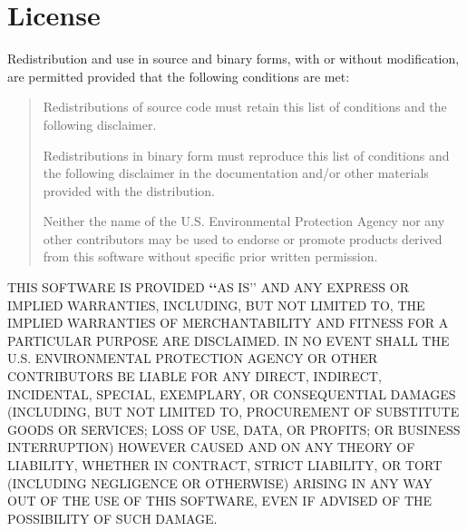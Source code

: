 \documentclass[letterpaper,10pt,english]{sphinxmanual}
\begin{document}
\section{License}
\label{\detokenize{license:license}}\label{\detokenize{license:id1}}\label{\detokenize{license::doc}}
Redistribution and use in source and binary forms, with or without modification,
are permitted provided that the following conditions are met:
\begin{quote}

Redistributions of source code must retain this list of conditions and the
following disclaimer.

Redistributions in binary form must reproduce this list of conditions and
the following disclaimer in the documentation and/or other materials
provided with the distribution.

Neither the name of the U.S. Environmental Protection Agency nor any other
contributors may be used to endorse or promote products derived from this
software without specific prior written permission.
\end{quote}

THIS SOFTWARE IS PROVIDED {\color{red}\bfseries{}{}`{}`}AS IS’’ AND ANY EXPRESS OR IMPLIED
WARRANTIES, INCLUDING, BUT NOT LIMITED TO, THE IMPLIED
WARRANTIES OF MERCHANTABILITY AND FITNESS FOR A PARTICULAR
PURPOSE ARE DISCLAIMED. IN NO EVENT SHALL THE U.S. ENVIRONMENTAL
PROTECTION AGENCY OR OTHER CONTRIBUTORS BE LIABLE FOR ANY DIRECT,
INDIRECT, INCIDENTAL, SPECIAL, EXEMPLARY, OR CONSEQUENTIAL
DAMAGES (INCLUDING, BUT NOT LIMITED TO, PROCUREMENT OF
SUBSTITUTE GOODS OR SERVICES; LOSS OF USE, DATA, OR PROFITS; OR
BUSINESS INTERRUPTION) HOWEVER CAUSED AND ON ANY THEORY OF
LIABILITY, WHETHER IN CONTRACT, STRICT LIABILITY, OR TORT
(INCLUDING NEGLIGENCE OR OTHERWISE) ARISING IN ANY WAY OUT OF
THE USE OF THIS SOFTWARE, EVEN IF ADVISED OF THE POSSIBILITY OF
SUCH DAMAGE.



\renewcommand{\indexname}{Index}
\printindex
\end{document}
